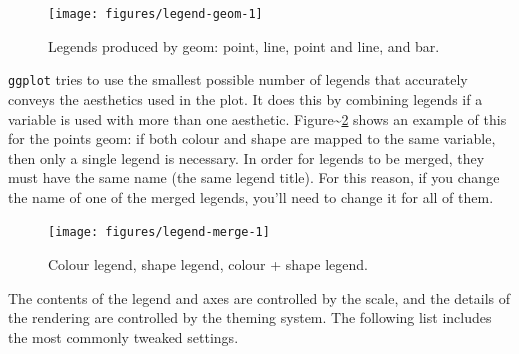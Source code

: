 \begin{figure}
\texttt{[image: figures/legend-geom-1]} \caption{Legends produced by geom: point, line, point and line, and bar.\label{fig:legend-geom}}
\end{figure}

\texttt{ggplot} tries to use the smallest possible number of legends
that accurately conveys the aesthetics used in the plot. It does this by
combining legends if a variable is used with more than one aesthetic.
Figure\textasciitilde{}\ref{fig:legend-merge} shows an example of this
for the points geom: if both colour and shape are mapped to the same
variable, then only a single legend is necessary. In order for legends
to be merged, they must have the same name (the same legend title). For
this reason, if you change the name of one of the merged legends, you'll
need to change it for all of them.

\begin{Shaded}
\begin{Highlighting}[]
\StringTok{ }\NormalTok{(diamonds[}\NormalTok{:}\NormalTok{, ], }\StringTok{ }\NormalTok{() }
\StringTok{ }\StringTok{ }\NormalTok{(} 
\StringTok{ }\StringTok{ }\NormalTok{(} 
\StringTok{ }\StringTok{ }\NormalTok{(}  
\NormalTok{(} \NormalTok{)}
\end{Highlighting}
\end{Shaded}

\begin{figure}
\texttt{[image: figures/legend-merge-1]} \caption{Colour legend, shape legend, colour + shape legend.\label{fig:legend-merge}}
\end{figure}

The contents of the legend and axes are controlled by the scale, and the
details of the rendering are controlled by the theming system. The
following list includes the most commonly tweaked settings.

